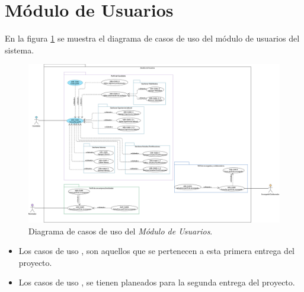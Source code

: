 	
	


\section{Módulo de Usuarios}
	En la figura \ref{adcu:usr} se muestra el diagrama de casos de uso del módulo de usuarios del sistema.

	\begin{figure}[hbtp!]
		\begin{center}
			\includegraphics[width=1 \textwidth]{anexos/imagenes/CUUSR.png}
		\end{center}
		
		\caption{Diagrama de casos de uso del \textit{Módulo de Usuarios}.}
		\label{adcu:usr}
	\end{figure}

	\begin{itemize}
        \item Los casos de uso \IUazul{} , son aquellos que se pertenecen a esta primera entrega del proyecto.
        \item Los casos de uso \IUblanco{}, se tienen planeados para la segunda entrega del proyecto.
    \end{itemize} 

	
	



